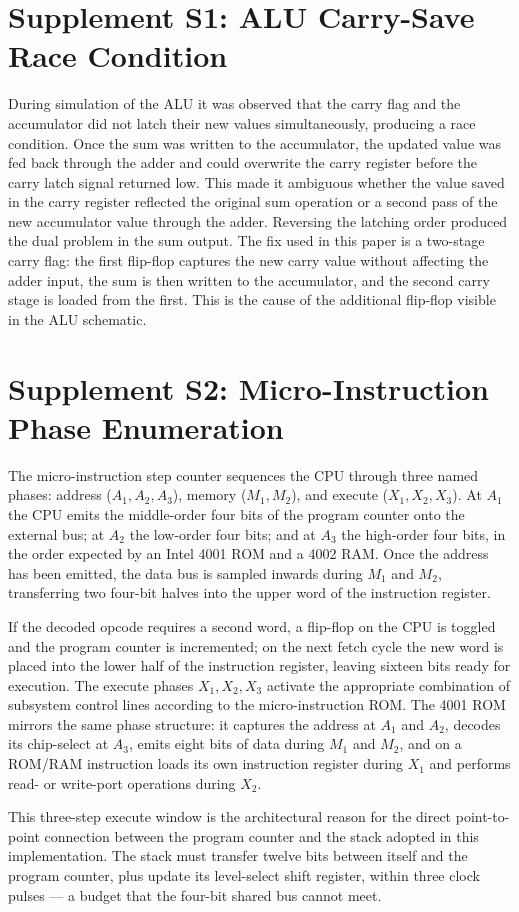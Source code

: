 \section*{Supplement S1: ALU Carry-Save Race Condition}
\label{supp:carry-race}

During simulation of the ALU it was observed that the carry flag and the accumulator did not latch their new values simultaneously, producing a race condition. Once the sum was written to the accumulator, the updated value was fed back through the adder and could overwrite the carry register before the carry latch signal returned low. This made it ambiguous whether the value saved in the carry register reflected the original sum operation or a second pass of the new accumulator value through the adder. Reversing the latching order produced the dual problem in the sum output. The fix used in this paper is a two-stage carry flag: the first flip-flop captures the new carry value without affecting the adder input, the sum is then written to the accumulator, and the second carry stage is loaded from the first. This is the cause of the additional flip-flop visible in the ALU schematic.

\section*{Supplement S2: Micro-Instruction Phase Enumeration}
\label{supp:micro-phases}

The micro-instruction step counter sequences the CPU through three named phases: address ($A_1, A_2, A_3$), memory ($M_1, M_2$), and execute ($X_1, X_2, X_3$). At $A_1$ the CPU emits the middle-order four bits of the program counter onto the external bus; at $A_2$ the low-order four bits; and at $A_3$ the high-order four bits, in the order expected by an Intel 4001 ROM and a 4002 RAM. Once the address has been emitted, the data bus is sampled inwards during $M_1$ and $M_2$, transferring two four-bit halves into the upper word of the instruction register.

If the decoded opcode requires a second word, a flip-flop on the CPU is toggled and the program counter is incremented; on the next fetch cycle the new word is placed into the lower half of the instruction register, leaving sixteen bits ready for execution. The execute phases $X_1, X_2, X_3$ activate the appropriate combination of subsystem control lines according to the micro-instruction ROM. The 4001 ROM mirrors the same phase structure: it captures the address at $A_1$ and $A_2$, decodes its chip-select at $A_3$, emits eight bits of data during $M_1$ and $M_2$, and on a ROM/RAM instruction loads its own instruction register during $X_1$ and performs read- or write-port operations during $X_2$.

This three-step execute window is the architectural reason for the direct point-to-point connection between the program counter and the stack adopted in this implementation. The stack must transfer twelve bits between itself and the program counter, plus update its level-select shift register, within three clock pulses --- a budget that the four-bit shared bus cannot meet.

